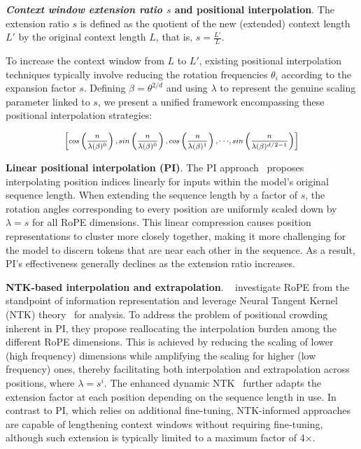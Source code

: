 \textbf{\emph{Context window extension ratio $s$} and positional interpolation}. The extension ratio $s$ is defined as the quotient of the new (extended) context length $L'$ by the original context length $L$, that is, $s=\frac{L'}{L}$.

To increase the context window from $L$ to $L'$, existing positional interpolation techniques typically involve reducing the rotation frequencies $\theta_i$ according to the expansion factor $s$. Defining $\beta=\theta^{2/d}$ and using $\lambda$ to represent the genuine scaling parameter linked to $s$, we present a unified framework encompassing these positional interpolation strategies:

\begin{equation}	
	\fontsize{7.5}{7.5} \selectfont
	\label{eq:unified_rope}
	\begin{aligned}
		\left[cos\left(\frac{n}{\lambda(\beta)^0}\right), sin \left(\frac{n}{\lambda(\beta)^0}\right), cos\left(\frac{n}{\lambda(\beta)^1}\right), \cdot\cdot\cdot,  sin \left(\frac{n}{\lambda(\beta)^{d/2-1}}\right) \right]   
	\end{aligned}
\end{equation}

\textbf{Linear positional interpolation (PI)}. The PI approach~\cite{pi} proposes interpolating position indices linearly for inputs within the model's original sequence length. When extending the sequence length by a factor of $s$, the rotation angles corresponding to every position are uniformly scaled down by $\lambda=s$ for all RoPE dimensions. This linear compression causes position representations to cluster more closely together, making it more challenging for the model to discern tokens that are near each other in the sequence. As a result, PI's effectiveness generally declines as the extension ratio increases.

\textbf{NTK-based interpolation and extrapolation}. ~\cite{ntk,dynamicntk} investigate RoPE from the standpoint of information representation and leverage Neural Tangent Kernel (NTK) theory~\cite{jacot2018neural,tancik2020fourier} for analysis. To address the problem of positional crowding inherent in PI, they propose reallocating the interpolation burden among the different RoPE dimensions. This is achieved by reducing the scaling of lower (high frequency) dimensions while amplifying the scaling for higher (low frequency) ones, thereby facilitating both interpolation and extrapolation across positions, where $\lambda=s^{i}$. The enhanced dynamic NTK~\cite{dynamicntk} further adapts the extension factor at each position depending on the sequence length in use. In contrast to PI, which relies on additional fine-tuning, NTK-informed approaches are capable of lengthening context windows without requiring fine-tuning, although such extension is typically limited to a maximum factor of 4$\times$.

